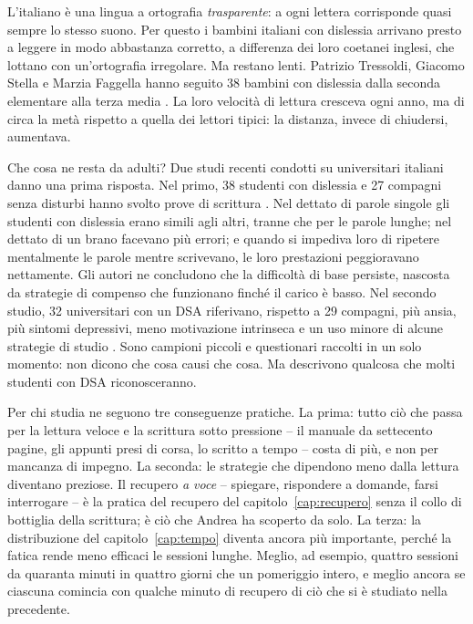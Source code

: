 L'italiano è una lingua a ortografia \emph{trasparente}: a ogni
lettera corrisponde quasi sempre lo stesso suono. Per questo i bambini
italiani con dislessia arrivano presto a leggere in modo abbastanza
corretto, a differenza dei loro coetanei inglesi, che lottano con
un'ortografia irregolare. Ma restano lenti. Patrizio Tressoldi,
Giacomo Stella e Marzia Faggella hanno seguito 38 bambini con
dislessia dalla seconda elementare alla terza media
\parencite{tressoldi2001}. La loro velocità di lettura cresceva ogni
anno, ma di circa la metà rispetto a quella dei lettori tipici: la distanza, invece di chiudersi, aumentava.

Che cosa ne resta da adulti? Due studi recenti condotti su universitari
italiani danno una prima risposta. Nel primo, 38 studenti con
dislessia e 27 compagni senza disturbi hanno svolto prove di
scrittura \parencite{angelelli2024}. Nel dettato di parole singole gli
studenti con dislessia erano simili agli altri, tranne che per le
parole lunghe; nel dettato di un brano facevano più errori; e quando
si impediva loro di ripetere mentalmente le parole mentre scrivevano,
le loro prestazioni peggioravano nettamente. Gli autori ne
concludono che la difficoltà di base persiste, nascosta da strategie di
compenso che funzionano finché il carico è basso. Nel secondo studio,
32 universitari con un DSA riferivano, rispetto a 29 compagni, più
ansia, più sintomi depressivi, meno motivazione intrinseca e un uso
minore di alcune strategie di studio \parencite{iaia2024}. Sono
campioni piccoli e questionari raccolti in un solo momento: non dicono
che cosa causi che cosa. Ma descrivono qualcosa che molti studenti con
DSA riconosceranno.

Per chi studia ne seguono tre conseguenze pratiche. La prima: tutto ciò
che passa per la lettura veloce e la scrittura sotto pressione -- il
manuale da settecento pagine, gli appunti presi di corsa, lo scritto a
tempo -- costa di più, e non per mancanza di impegno. La seconda: le
strategie che dipendono meno dalla lettura diventano preziose. Il
recupero \emph{a voce} -- spiegare, rispondere a domande, farsi
interrogare -- è la pratica del recupero del capitolo~\ref{cap:recupero}
senza il collo di bottiglia della scrittura; è ciò che Andrea ha
scoperto da solo. La terza: la distribuzione del capitolo~\ref{cap:tempo}
diventa ancora più importante, perché la fatica rende meno efficaci le sessioni lunghe. Meglio, ad esempio, quattro sessioni da quaranta minuti in quattro giorni che un pomeriggio intero, e meglio ancora se ciascuna comincia
con qualche minuto di recupero di ciò che si è studiato nella
precedente.

